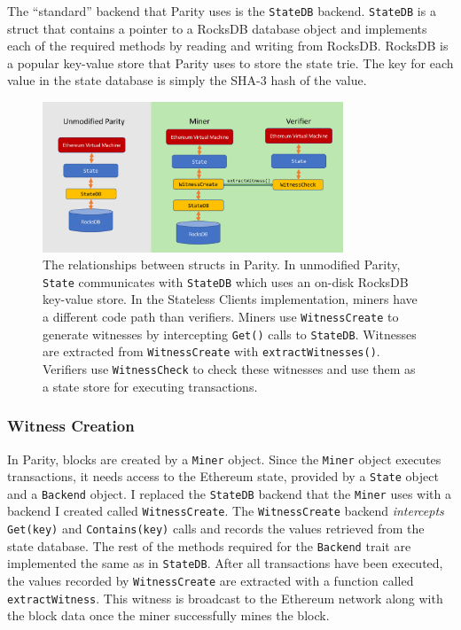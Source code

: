 \documentclass[12pt]{article}
\newcommand{\System}{Stateless Clients\xspace}
\newcommand{\figurewidth}{0.8\textwidth}
\begin{document}
The ``standard'' backend that Parity uses is the \texttt{StateDB} backend. \texttt{StateDB} is a struct that contains a pointer to a RocksDB database object and implements each of the required methods by reading and writing from RocksDB. RocksDB is a popular key-value store that Parity uses to store the state trie. The key for each value in the state database is simply the SHA-3 hash of the value.

\begin{figure}[H]
  \centering
  \includegraphics[width=\figurewidth]{../figures/implementation/code_layout.pdf}
  \caption{The relationships between structs in Parity. In unmodified Parity, \texttt{State} communicates with \texttt{StateDB} which uses an on-disk RocksDB key-value store. In the \System implementation, miners have a different code path than verifiers. Miners use \texttt{WitnessCreate} to generate witnesses by intercepting \texttt{Get()} calls to \texttt{StateDB}. Witnesses are extracted from \texttt{WitnessCreate} with \texttt{extractWitnesses()}. Verifiers use \texttt{WitnessCheck} to check these witnesses and use them as a state store for executing transactions.}
  \label{fig:parityrelationships}
\end{figure}

\subsubsection{Witness Creation}

In Parity, blocks are created by a \texttt{Miner} object. Since the \texttt{Miner} object executes transactions, it needs access to the Ethereum state, provided by a \texttt{State} object and a \texttt{Backend} object. I replaced the \texttt{StateDB} backend that the \texttt{Miner} uses with a backend I created called \texttt{WitnessCreate}. The \texttt{WitnessCreate} backend \emph{intercepts} \texttt{Get(key)} and \texttt{Contains(key)} calls and records the values retrieved from the state database. The rest of the methods required for the \texttt{Backend} trait are implemented the same as in \texttt{StateDB}. After all transactions have been executed, the values recorded by \texttt{WitnessCreate} are extracted with a function called \texttt{extractWitness}. This witness is broadcast to the Ethereum network along with the block data once the miner successfully mines the block.
\end{document}
